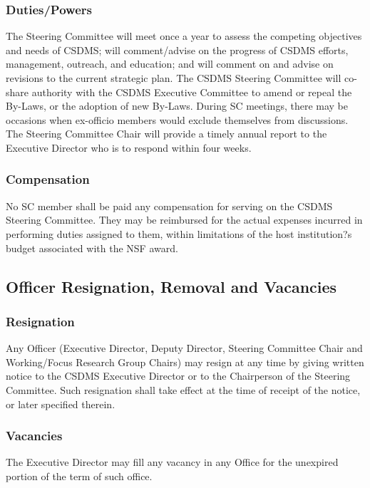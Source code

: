\documentclass[11pt, oneside]{article}   	%
\begin{document}
\subsubsection{Duties/Powers}
	
The Steering Committee will meet once a year to assess the competing objectives and needs of CSDMS; will comment/advise on the progress of CSDMS efforts, management, outreach, and education; and will comment on and advise on revisions to the current strategic plan. The CSDMS Steering Committee will co-share authority with the CSDMS Executive Committee to amend or repeal the By-Laws, or the adoption of new By-Laws. During SC meetings, there may be occasions when ex-officio members would exclude themselves from discussions. The Steering Committee Chair will provide a timely annual report to the Executive Director who is to respond within four weeks.
	
\subsubsection{Compensation}
	
No SC member shall be paid any compensation for serving on the CSDMS Steering Committee. They may be reimbursed for the actual expenses incurred in performing duties assigned to them, within limitations of the host institution?s budget associated with the NSF award.
	
	
 \subsection{Officer Resignation, Removal and Vacancies}
 
\subsubsection{	Resignation}

Any Officer (Executive Director, Deputy Director, Steering Committee Chair and Working/Focus Research Group Chairs) may resign at any time by giving written notice to the CSDMS Executive Director or to the Chairperson of the Steering Committee. Such resignation shall take effect at the time of receipt of the notice, or later specified therein. 

\subsubsection{	Vacancies}

The Executive Director may fill any vacancy in any Office for the unexpired portion of the term of such office. 
\end{document}
